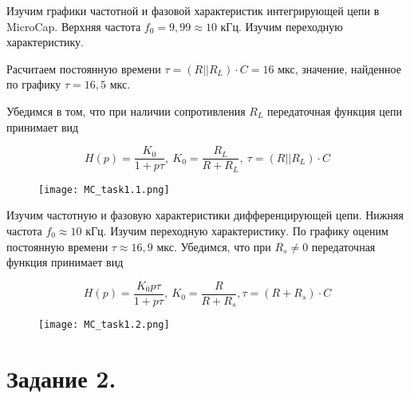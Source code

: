 

	\noindent Изучим графики частотной и фазовой характеристик интегрирующей цепи в MicroCap. 
	Верхняя частота $f_0 = 9,99 \approx 10$ кГц. Изучим переходную характеристику.

	\noindent Расчитаем постоянную времени $\tau = (R || R_L) \cdot C = 16$ мкс, значение, найденное по графику $\tau = 16,5$ мкс.

	\noindent Убедимся в том, что при наличии сопротивления $R_L$ передаточная функция
	цепи принимает вид

	\begin{equation*}
		H(p) = \frac{K_0}{1 + p \tau}, ~ K_0 = \frac{R_L}{R + R_L}, ~ \tau = (R || R_L) \cdot C
	\end{equation*}

	\begin{figure}[h!]
		\centering
		\texttt{[image: MC\_task1.1.png]}
		\caption{}
	\end{figure}


	\noindent Изучим частотную и фазовую характеристики дифференцирующей цепи. Нижняя частота $f_0 \approx 10$ кГц. Изучим переходную
	характеристику. По графику оценим постоянную времени $\tau \approx 16,9$ мкс. 
	Убедимся, что при $R_s \neq 0$ передаточная функция принимает вид

	\begin{equation*}
		H(p) = \frac{K_0 p \tau}{1 + p \tau}, ~ K_0 = \frac{R}{R + R_s}, \tau = (R + R_s) \cdot C
	\end{equation*}

	\begin{figure}[h!]
		\centering
		\texttt{[image: MC\_task1.2.png]}
		\caption{}
	\end{figure}	

	
	\section*{Задание 2.}

